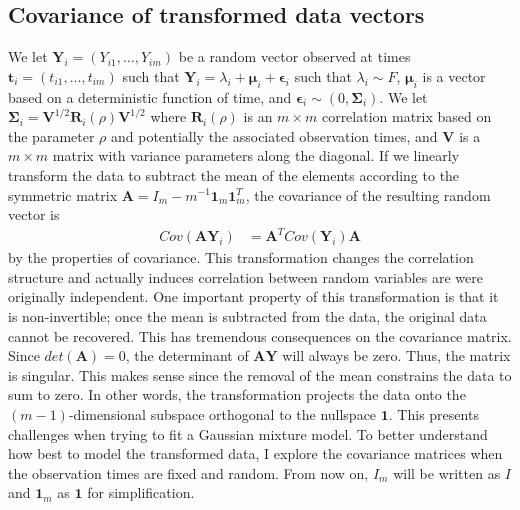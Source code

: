 \documentclass[12pt]{article}
\newcommand{\B}[0]{\mathbf}
\newcommand{\bs}[0]{\boldsymbol}
\begin{document}
\subsection{Covariance of transformed data vectors}
We let $\B Y_{i}=(Y_{i1},...,Y_{im})$ be a random vector observed at times $\B t_{i}=(t_{i1},...,t_{im})$ such that
$\B Y_{i} = \lambda_{i} + \bs\mu_{i} + \bs\epsilon_{i}$
such that $\lambda_{i}\sim F$, $\bs\mu_{i}$ is a vector based on a deterministic function of time, and $\bs\epsilon_{i}\sim(0,\bs\Sigma_{i})$. We let $\B\Sigma_{i} =\B V^{1/2}\B R_{i}(\rho)\B V^{1/2}$ where $\B R_{i}(\rho)$ is an $m\times m$ correlation matrix based on the parameter $\rho$ and potentially the associated observation times, and $\B V$ is a $m\times m$ matrix with variance parameters along the diagonal. If we linearly transform the data to subtract the mean of the elements according to the symmetric matrix $\B A = I_{m}-m^{-1}\B 1_{m}\B 1_{m}^{T}$, the covariance of the resulting random vector is
\begin{align*}
Cov(\B A\B Y_{i}) &= \B A^{T}Cov(\B Y_{i})\B A
\end{align*}
by the properties of covariance. This transformation changes the correlation structure and actually induces correlation between random variables are were originally independent. One important property of this transformation is that it is non-invertible; once the mean is subtracted from the data, the original data cannot be recovered. This has tremendous consequences on the covariance matrix. Since $det(\B A) = 0$, the determinant of $\B A\B Y$ will always be zero. Thus, the matrix is singular. This makes sense since the removal of the mean constrains the data to sum to zero. In other words, the transformation projects the data onto the $(m-1)$-dimensional subspace orthogonal to the nullspace $\B 1$. This presents challenges when trying to fit a Gaussian mixture model. To better understand how best to model the transformed data, I explore the covariance matrices when the observation times are fixed and random. From now on, $I_{m}$ will be written as $I$ and $\B 1_{m}$ as $\B 1$ for simplification.
\end{document}
